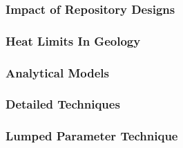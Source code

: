 
\begin{frame}[ctb!]
  \frametitle{Impact of Repository Designs}
\end{frame}

\begin{frame}[ctb!]
  \frametitle{Heat Limits In Geology}
\end{frame}

\begin{frame}[ctb!]
  \frametitle{Analytical Models}
\end{frame}

\begin{frame}[ctb!]
  \frametitle{Detailed Techniques}
\end{frame}


\begin{frame}[ctb!]
  \frametitle{Lumped Parameter Technique}
\end{frame}

